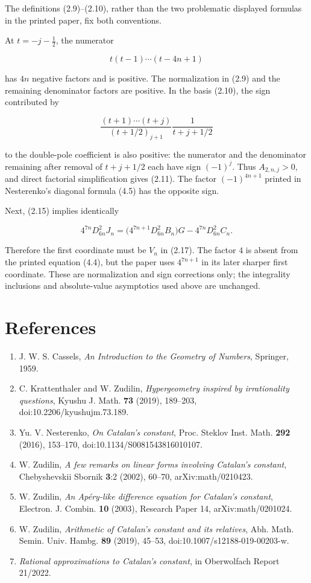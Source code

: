 \documentclass[
  11pt,
]{article}
\providecommand{\tightlist}{%
  \setlength{\itemsep}{0pt}\setlength{\parskip}{0pt}}
\begin{document}
The definitions (2.9)--(2.10), rather than the two problematic displayed
formulas in the printed paper, fix both conventions.

At \(t=-j-\tfrac12\), the numerator

\[
 t(t-1)\cdots(t-4n+1)
\]

has \(4n\) negative factors and is positive. The normalization in (2.9)
and the remaining denominator factors are positive. In the basis (2.10),
the sign contributed by

\[
 \frac{(t+1)\cdots(t+j)}{(t+1/2)_{j+1}}
 \frac1{t+j+1/2}
\]

to the double-pole coefficient is also positive: the numerator and the
denominator remaining after removal of \(t+j+1/2\) each have sign
\((-1)^j\). Thus \(A_{2,n,j}>0\), and direct factorial simplification
gives (2.11). The factor \((-1)^{4n+1}\) printed in Nesterenko's
diagonal formula (4.5) has the opposite sign.

Next, (2.15) implies identically

\[
 4^{7n}D_{6n}^2J_n
 =\bigl(4^{7n+1}D_{6n}^2B_n\bigr)G
  -4^{7n}D_{6n}^2C_n.
\]

Therefore the first coordinate must be \(V_n\) in (2.17). The factor
\(4\) is absent from the printed equation (4.4), but the paper uses
\(4^{7n+1}\) in its later sharper first coordinate. These are
normalization and sign corrections only; the integrality inclusions and
absolute-value asymptotics used above are unchanged.

\hypertarget{references}{%
\section{References}\label{references}}

\begin{enumerate}
\def\labelenumi{\arabic{enumi}.}
\tightlist
\item
  J. W. S. Cassels, \emph{An Introduction to the Geometry of Numbers},
  Springer, 1959.
\item
  C. Krattenthaler and W. Zudilin, \emph{Hypergeometry inspired by
  irrationality questions}, Kyushu J. Math. \textbf{73} (2019),
  189--203, doi:10.2206/kyushujm.73.189.
\item
  Yu. V. Nesterenko, \emph{On Catalan's constant}, Proc. Steklov Inst.
  Math. \textbf{292} (2016), 153--170, doi:10.1134/S0081543816010107.
\item
  W. Zudilin, \emph{A few remarks on linear forms involving Catalan's
  constant}, Chebyshevskii Sbornik \textbf{3}:2 (2002), 60--70,
  arXiv:math/0210423.
\item
  W. Zudilin, \emph{An Apéry-like difference equation for Catalan's
  constant}, Electron. J. Combin. \textbf{10} (2003), Research Paper 14,
  arXiv:math/0201024.
\item
  W. Zudilin, \emph{Arithmetic of Catalan's constant and its relatives},
  Abh. Math. Semin. Univ. Hambg. \textbf{89} (2019), 45--53,
  doi:10.1007/s12188-019-00203-w.
\item
  \emph{Rational approximations to Catalan's constant}, in Oberwolfach
  Report 21/2022.
\end{enumerate}
\end{document}
